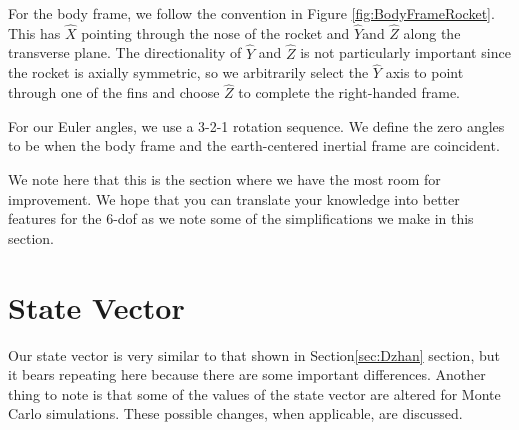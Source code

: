 \documentclass[12pt]{report}
\begin{document}
For the body frame, we follow the convention in Figure \ref{fig:BodyFrameRocket}. This has $\hat{X}$ pointing through the nose of the rocket and $\hat{Y}$and $\hat{Z}$ along the transverse plane. The directionality of $\hat{Y}$ and $\hat{Z}$ is not particularly important since the rocket is axially symmetric, so we arbitrarily select the $\hat{Y}$ axis to point through one of the fins and choose $\hat{Z}$ to complete the right-handed frame.

For our \gls{Euler angles}, we use a 3-2-1 rotation sequence. We define the zero angles to be when the body frame and the earth-centered inertial frame are coincident.

We note here that this is the section where we have the most room for improvement. We hope that you can translate your knowledge into better features for the 6-\gls{dof} as we note some of the simplifications we make in this section.

\section{State Vector}
Our \gls{state vector} is very similar to that shown in Section\ref{sec:Dzhan} section, but it bears repeating here because there are some important differences. Another thing to note is that some of the values of the \gls{state vector} are altered for Monte Carlo simulations. These possible changes, when applicable, are discussed.
\end{document}
